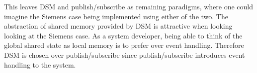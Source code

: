 This leaves DSM and publish/subscribe as remaining paradigms, where one could imagine the Siemens case being implemented using either of the two. The abstraction of shared memory provided by DSM is attractive when looking looking at the Siemens case. As a system developer, being able to think of the global shared state as local memory is to prefer over event handling. Therefore DSM is chosen over publish/subscribe since publish/subscribe introduces event handling to the system.




%

